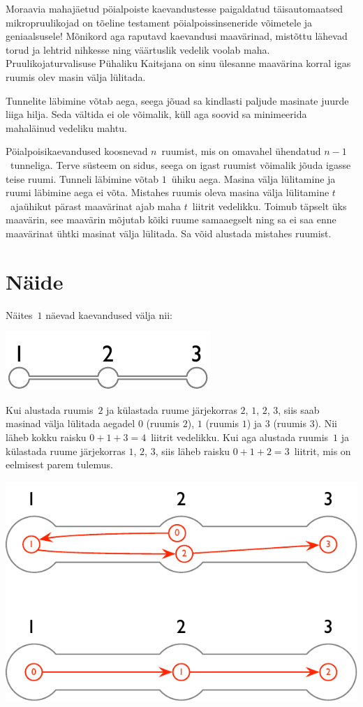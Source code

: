 
\noindent

Moraavia mahajäetud pöialpoiste kaevandustesse paigaldatud täisautomaatsed mikropruulikojad on
tõeline testament pöialpoissinseneride võimetele ja geniaalsusele!
Mõnikord aga raputavd kaevandusi maavärinad, mistõttu lähevad torud ja lehtrid nihkesse ning
väärtuslik vedelik voolab maha.
Pruulikojaturvalisuse Pühaliku Kaitsjana on sinu ülesanne maavärina korral igas ruumis olev masin
välja lülitada.

Tunnelite läbimine võtab aega,
seega jõuad sa kindlasti paljude masinate juurde liiga hilja.
Seda vältida ei ole võimalik, küll aga soovid sa minimeerida mahaläinud vedeliku mahtu.

\medskip
Pöialpoisikaevandused koosnevad $n$~ruumist, mis on omavahel ühendatud $n-1$~tunneliga.
Terve süsteem on sidus, seega on igast ruumist võimalik jõuda igasse teise ruumi.
Tunneli läbimine võtab $1$~ühiku aega.
Masina välja lülitamine ja ruumi läbimine aega ei võta.
Mistahes ruumis oleva masina välja lülitamine $t$~ajaühikut pärast maavärinat ajab maha $t$~liitrit
vedelikku.
Toimub täpselt üks maavärin, see maavärin mõjutab kõiki ruume samaaegselt ning sa ei saa enne
maavärinat ühtki masinat välja lülitada.
Sa võid alustada mistahes ruumist.

\section*{Näide}

Näites~$1$ näevad kaevandused välja nii:

\includegraphics[width=.2\textwidth]{img/sample-1.pdf}

Kui alustada ruumis~$2$ ja külastada ruume järjekorras $2$, $1$, $2$, $3$, siis saab masinad välja
lülitada aegadel $0$ (ruumis $2$), $1$ (ruumis $1$) ja $3$ (ruumis $3$). Nii läheb kokku raisku
$0+1+3=4$~liitrit vedelikku.
Kui aga alustada ruumis~$1$ ja külastada ruume järjekorras $1$, $2$, $3$, siis läheb raisku
$0+1+2=3$~liitrit, mis on eelmisest parem tulemus.

\includegraphics[width=.4\textwidth]{img/sample-1-ans.pdf}

